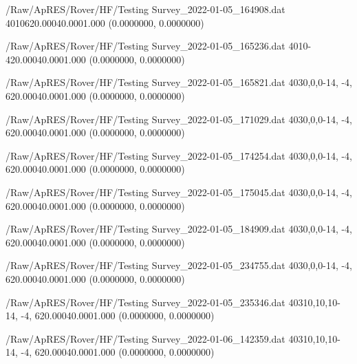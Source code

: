 \hfaprestable
{/Raw/ApRES/Rover/HF/Testing}%
{Survey\_2022-01-05\_164908.dat}%
{40}{1}{0}{6}{20.000}{40.000}{1.000}%
{ (0.0000000, 0.0000000)}%
{}%
{}%

\hfaprestable
{/Raw/ApRES/Rover/HF/Testing}%
{Survey\_2022-01-05\_165236.dat}%
{40}{1}{0}{-4}{20.000}{40.000}{1.000}%
{ (0.0000000, 0.0000000)}%
{}%
{}%

\hfaprestable
{/Raw/ApRES/Rover/HF/Testing}%
{Survey\_2022-01-05\_165821.dat}%
{40}{3}{0,0,0}{-14, -4,  6}{20.000}{40.000}{1.000}%
{ (0.0000000, 0.0000000)}%
{}%
{}%

\hfaprestable
{/Raw/ApRES/Rover/HF/Testing}%
{Survey\_2022-01-05\_171029.dat}%
{40}{3}{0,0,0}{-14, -4,  6}{20.000}{40.000}{1.000}%
{ (0.0000000, 0.0000000)}%
{}%
{}%

\hfaprestable
{/Raw/ApRES/Rover/HF/Testing}%
{Survey\_2022-01-05\_174254.dat}%
{40}{3}{0,0,0}{-14, -4,  6}{20.000}{40.000}{1.000}%
{ (0.0000000, 0.0000000)}%
{}%
{}%

\hfaprestable
{/Raw/ApRES/Rover/HF/Testing}%
{Survey\_2022-01-05\_175045.dat}%
{40}{3}{0,0,0}{-14, -4,  6}{20.000}{40.000}{1.000}%
{ (0.0000000, 0.0000000)}%
{}%
{}%

\hfaprestable
{/Raw/ApRES/Rover/HF/Testing}%
{Survey\_2022-01-05\_184909.dat}%
{40}{3}{0,0,0}{-14, -4,  6}{20.000}{40.000}{1.000}%
{ (0.0000000, 0.0000000)}%
{}%
{}%

\hfaprestable
{/Raw/ApRES/Rover/HF/Testing}%
{Survey\_2022-01-05\_234755.dat}%
{40}{3}{0,0,0}{-14, -4,  6}{20.000}{40.000}{1.000}%
{ (0.0000000, 0.0000000)}%
{}%
{}%

\hfaprestable
{/Raw/ApRES/Rover/HF/Testing}%
{Survey\_2022-01-05\_235346.dat}%
{40}{3}{10,10,10}{-14, -4,  6}{20.000}{40.000}{1.000}%
{ (0.0000000, 0.0000000)}%
{}%
{}%

\hfaprestable
{/Raw/ApRES/Rover/HF/Testing}%
{Survey\_2022-01-06\_142359.dat}%
{40}{3}{10,10,10}{-14, -4,  6}{20.000}{40.000}{1.000}%
{ (0.0000000, 0.0000000)}%
{}%
{}%

